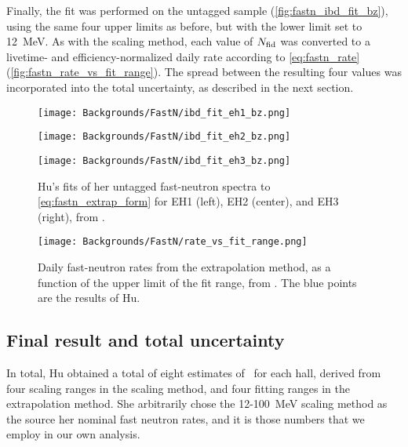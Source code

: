 \documentclass[../thesis.tex]{subfiles}
\begin{document}
Finally, the fit was performed on the untagged sample (\autoref{fig:fastn_ibd_fit_bz}), using the same four upper limits as before, but with the lower limit set to 12~MeV.  As with the scaling method, each value of $N_\mathrm{fid}$ was converted to a livetime- and efficiency-normalized daily rate according to \eqref{eq:fastn_rate} (\autoref{fig:fastn_rate_vs_fit_range}). The spread between the resulting four values was incorporated into the total uncertainty, as described in the next section.

\begin{figure}[ht]
  \begin{minipage}{0.333\linewidth}%
    \texttt{[image: Backgrounds/FastN/ibd\_fit\_eh1\_bz.png]}%
  \end{minipage}%
  \begin{minipage}{0.333\linewidth}%
    \texttt{[image: Backgrounds/FastN/ibd\_fit\_eh2\_bz.png]}%
  \end{minipage}%
  \begin{minipage}{0.333\linewidth}%
    \texttt{[image: Backgrounds/FastN/ibd\_fit\_eh3\_bz.png]}%
  \end{minipage}%
  \caption{Hu's fits of her untagged fast-neutron spectra to \autoref{eq:fastn_extrap_form} for EH1 (left), EH2 (center), and EH3 (right), from \cite{fastn}.}
  \label{fig:fastn_ibd_fit_bz}
\end{figure}

\begin{figure}[h]
  \texttt{[image: Backgrounds/FastN/rate\_vs\_fit\_range.png]}
  \caption{Daily fast-neutron rates from the extrapolation method, as a function of the upper limit of the fit range, from \cite{fastn}. The blue points are the results of Hu.}
  \label{fig:fastn_rate_vs_fit_range}
\end{figure}

\subsection{Final result and total uncertainty}
\label{sec:fastn_comb}

In total, Hu obtained a total of eight estimates of \rfn\ for each hall, derived from four scaling ranges in the scaling method, and four fitting ranges in the extrapolation method. She arbitrarily chose the 12-100~MeV scaling method as the source her nominal fast neutron rates, and it is those numbers that we employ in our own analysis.
\end{document}
